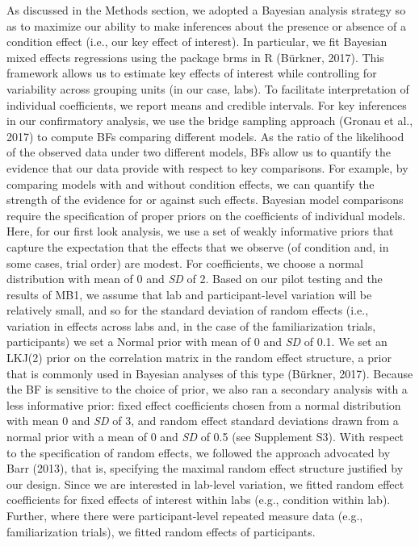 \documentclass[
  man,floatsintext]{apa6}
\begin{document}
As discussed in the Methods section, we adopted a Bayesian analysis strategy so as to maximize our ability to make inferences about the presence or absence of a condition effect (i.e., our key effect of interest). In particular, we fit Bayesian mixed effects regressions using the package brms in R (Bürkner, 2017). This framework allows us to estimate key effects of interest while controlling for variability across grouping units (in our case, labs).
To facilitate interpretation of individual coefficients, we report means and credible intervals. For key inferences in our confirmatory analysis, we use the bridge sampling approach (Gronau et al., 2017) to compute BFs comparing different models. As the ratio of the likelihood of the observed data under two different models, BFs allow us to quantify the evidence that our data provide with respect to key comparisons. For example, by comparing models with and without condition effects, we can quantify the strength of the evidence for or against such effects.
Bayesian model comparisons require the specification of proper priors on the coefficients of individual models. Here, for our first look analysis, we use a set of weakly informative priors that capture the expectation that the effects that we observe (of condition and, in some cases, trial order) are modest. For coefficients, we choose a normal distribution with mean of 0 and \emph{SD} of 2. Based on our pilot testing and the results of MB1, we assume that lab and participant-level variation will be relatively small, and so for the standard deviation of random effects (i.e., variation in effects across labs and, in the case of the familiarization trials, participants) we set a Normal prior with mean of 0 and \emph{SD} of 0.1. We set an LKJ(2) prior on the correlation matrix in the random effect structure, a prior that is commonly used in Bayesian analyses of this type (Bürkner, 2017). Because the BF is sensitive to the choice of prior, we also ran a secondary analysis with a less informative prior: fixed effect coefficients chosen from a normal distribution with mean 0 and \emph{SD} of 3, and random effect standard deviations drawn from a normal prior with a mean of 0 and \emph{SD} of 0.5 (see Supplement S3). With respect to the specification of random effects, we followed the approach advocated by Barr (2013), that is, specifying the maximal random effect structure justified by our design. Since we are interested in lab-level variation, we fitted random effect coefficients for fixed effects of interest within labs (e.g., condition within lab). Further, where there were participant-level repeated measure data (e.g., familiarization trials), we fitted random effects of participants.
\end{document}
